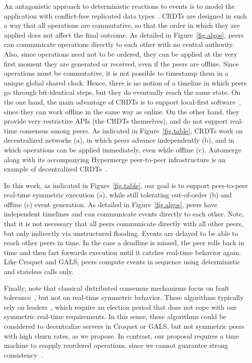 \documentclass[fleqn,10pt]{SelfArx}
\begin{document}
An antagonistic approach to deterministic reactions to events is to model the
application with conflict-free replicated data types~\cite{crdts}.
CRDTs are designed in such a way that all operations are commutative, so that
the order in which they are applied does not affect the final outcome.
%
As detailed in Figure~\ref{fig.algos}, peers can communicate operations
directly to each other with no central authority.
Also, since operations need not to be ordered, they can be applied at the
very first moment they are generated or received, even if the peers are
offline.
%
Since operations must be commutative, it is not possible to timestamp them
in a unique global shared clock.
Hence, there is no notion of a timeline in which peers go through
bit-identical steps, but they do eventually reach the same state.
%
On the one hand, the main advantage of CRDTs is to support local-first
software~\cite{local}, since they can work offline in the same way as online.
On the other hand, they provide very restrictive APIs (the CRDTs themselves),
and do not support real-time consensus among peers.
%
As indicated in Figure~\ref{fig.table}, CRDTs work on decentralized networks
(a), in which peers advance independently (b), and in which operations can be
applied immediately, even while offline (c).
%
Automerge along with its accompanying Hypermerge peer-to-peer infrastructure
is an example of decentralized CRDTs~\cite{p2p.automerge,p2p.pushpin}.

In this work, as indicated in Figure~\ref{fig.table}, our goal is to support
peer-to-peer real-time symmetric execution (a), while still tolerating
out-of-order (b) and offline (c) event generation.
%
As detailed in Figure~\ref{fig.algos}, peers have independent timelines and
can communicate events directly to each other.
Note, that it is not necessary that all peers communicate directly with all
other peers, but only indirectly via unstructured flooding.
Events are delayed to be able to reach other peers in time.
In the case a deadline is missed, the peer rolls back in time and then fast
forwards execution until it catches real-time behavior again.
%
Like Croquet and GALS, peers compute events in sequence using deterministic and
stateless calls only.

Finally, note that classical distributed consensus mechanisms focus on fault
tolerance~\cite{lamport}, but not on real-time symmetric behavior.
These algorithms typically rely on leaders~\cite{consensus.paxos.raft}, which
require an election period that does not cope with our symmetric real-time
requirements.
In this sense, these algorithms could be considered to decentralize servers in
Croquet or GALS, but not symmetric peers with high churn rates, as we propose.
In contrast, our proposal requires a time machine to reapply reordered
operations, since we cannot guarantee strong consistency~\cite{p2p.sec}.
\end{document}
